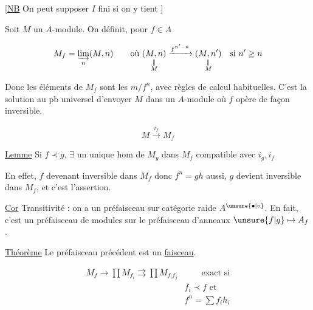 
[\uline{NB} On peut supposer $I$ fini si on y tient ]

Soit $M$ un $A$-module. On définit, pour $f\in A$

\[
M_f=\varinjlim_n(M,n)\qquad\text{où }\underset{\substack{\Vert\\M}}{(M,n)}
\xrightarrow{f^{n'-n}}\underset{\substack{\Vert\\M}}{(M,n')}\quad\text{si }n'\geq n
\]

Donc les éléments de $M_f$ sont les $m/f^n$, avec règles de calcul habituelles. C'est la solution au pb universel d'envoyer $M$ dans un $A$-module où $f$ opère de façon inversible.

\[
M\xrightarrow{i_f}M_f
\]

 \uline{Lemme} Si $f\prec g$, $\exists$ un unique hom de $M_g$ dans $M_f$ compatible avec $i_g,i_f$


En effet, $f$ devenant inversible dans $M_f$ donc $f^n=gh$ aussi, $g$ devient inversible dans $M_f$, et c'est  l'assertion.


\uline{Cor} Transitivité : on a un préfaisceau  sur  catégorie  raide $A^{\unsure{\bullet|\circ}}$. En fait, c'est un préfaisceau de modules sur le préfaisceau d'anneaux $\unsure{f|g}\mapsto A_f$.

\uline{Théorème} Le préfaisceau précédent est un \uline{faisceau}.

\[
\begin{aligned}
M_f\longrightarrow\prod M_{f_i}\rightrightarrows\prod M_{f_i f_j}
&\qquad\text{exact si}\\
& f_i\prec f\text{ et}\\
& f^n=\sum f_i h_i
\end{aligned}
\]


